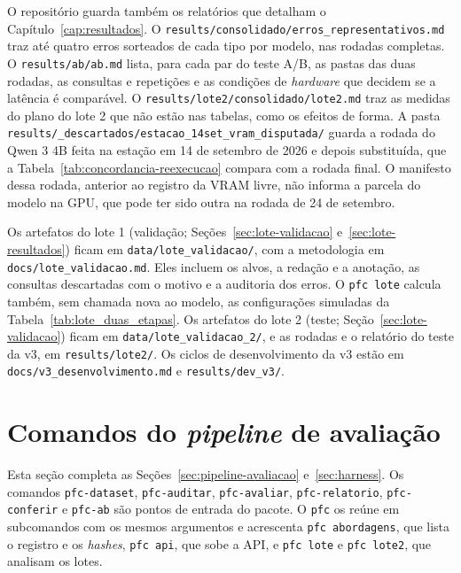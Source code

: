 O repositório guarda também os relatórios que detalham o Capítulo~\ref{cap:resultados}. O \texttt{results/\allowbreak consolidado/\allowbreak erros\_representativos.md} traz até quatro erros sorteados de cada tipo por modelo, nas rodadas completas. O \texttt{results/\allowbreak ab/\allowbreak ab.md} lista, para cada par do teste A/B, as pastas das duas rodadas, as consultas e repetições e as condições de \textit{hardware} que decidem se a latência é comparável. O \texttt{results/\allowbreak lote2/\allowbreak consolidado/\allowbreak lote2.md} traz as medidas do plano do lote 2 que não estão nas tabelas, como os efeitos de forma. A pasta \texttt{results/\allowbreak \_descartados/\allowbreak estacao\_14set\_vram\_disputada/} guarda a rodada do Qwen 3 4B feita na estação em 14 de setembro de 2026 e depois substituída, que a Tabela~\ref{tab:concordancia-reexecucao} compara com a rodada final. O manifesto dessa rodada, anterior ao registro da VRAM livre, não informa a parcela do modelo na GPU, que pode ter sido outra na rodada de 24 de setembro.

Os artefatos do lote 1 (validação; Seções~\ref{sec:lote-validacao} e~\ref{sec:lote-resultados}) ficam em \texttt{data/\allowbreak lote\_validacao/}, com a metodologia em \texttt{docs/lote\_validacao.md}. Eles incluem os alvos, a redação e a anotação, as consultas descartadas com o motivo e a auditoria dos erros. O \texttt{pfc lote} calcula também, sem chamada nova ao modelo, as configurações simuladas da Tabela~\ref{tab:lote_duas_etapas}. Os artefatos do lote 2 (teste; Seção~\ref{sec:lote-validacao}) ficam em \texttt{data/\allowbreak lote\_validacao\_2/}, e as rodadas e o relatório do teste da v3, em \texttt{results/lote2/}. Os ciclos de desenvolvimento da v3 estão em \texttt{docs/v3\_desenvolvimento.md} e \texttt{results/dev\_v3/}.

\section{Comandos do \textit{pipeline} de avaliação}
\label{apx:comandos}

Esta seção completa as Seções~\ref{sec:pipeline-avaliacao} e~\ref{sec:harness}. Os comandos \texttt{pfc-dataset}, \texttt{pfc-auditar}, \texttt{pfc-avaliar}, \texttt{pfc-relatorio}, \texttt{pfc-conferir} e \texttt{pfc-ab} são pontos de entrada do pacote. O \texttt{pfc} os reúne em subcomandos com os mesmos argumentos e acrescenta \texttt{pfc abordagens}, que lista o registro e os \textit{hashes}, \texttt{pfc api}, que sobe a API, e \texttt{pfc lote} e \texttt{pfc lote2}, que analisam os lotes.


